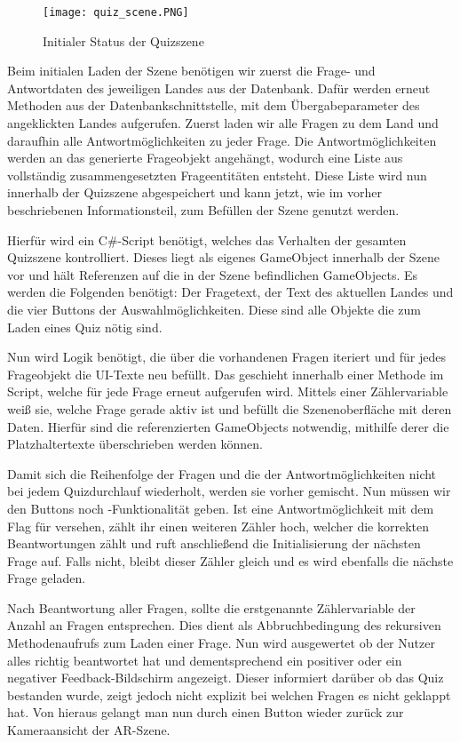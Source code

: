 \begin{figure} [h]
\centering
\texttt{[image: quiz\_scene.PNG]}
\caption{Initialer Status der Quizszene}
\label{fig:quizscene}
\end{figure}

Beim initialen Laden der Szene benötigen wir zuerst die Frage- und Antwortdaten des jeweiligen Landes aus der Datenbank.
Dafür werden erneut Methoden aus der Datenbankschnittstelle, mit dem Übergabeparameter des angeklickten Landes aufgerufen. 
Zuerst laden wir alle Fragen zu dem Land und daraufhin alle Antwortmöglichkeiten zu jeder Frage. 
Die Antwortmöglichkeiten werden an das generierte Frageobjekt angehängt, wodurch eine Liste aus vollständig zusammengesetzten Frageentitäten entsteht.
Diese Liste wird nun innerhalb der Quizszene abgespeichert und kann jetzt, wie im vorher beschriebenen Informationsteil, zum Befüllen der Szene genutzt werden.

Hierfür wird ein C\#-Script benötigt, welches das Verhalten der gesamten Quizszene kontrolliert.
Dieses liegt als eigenes GameObject innerhalb der Szene vor und hält Referenzen auf die in der Szene befindlichen GameObjects.
Es werden die Folgenden benötigt: Der Fragetext, der Text des aktuellen Landes und die vier Buttons der Auswahlmöglichkeiten.
Diese sind alle Objekte die zum Laden eines Quiz nötig sind.

Nun wird Logik benötigt, die über die vorhandenen Fragen iteriert und für jedes Frageobjekt die UI-Texte neu befüllt. Das geschieht innerhalb einer Methode im Script, welche für jede Frage erneut aufgerufen wird. 
Mittels einer Zählervariable weiß sie, welche Frage gerade aktiv ist und befüllt die Szenenoberfläche mit deren Daten.
Hierfür sind die referenzierten GameObjects notwendig, mithilfe derer die Platzhaltertexte überschrieben werden können. 

Damit sich die Reihenfolge der Fragen und die der Antwortmöglichkeiten nicht bei jedem Quizdurchlauf wiederholt, werden sie vorher gemischt. 
Nun müssen wir den Buttons noch -Funktionalität geben. 
Ist eine Antwortmöglichkeit mit dem Flag für  versehen, zählt ihr  einen weiteren Zähler hoch, welcher die korrekten Beantwortungen zählt und ruft anschließend die Initialisierung der nächsten Frage auf. 
Falls nicht, bleibt dieser Zähler gleich und es wird ebenfalls die nächste Frage geladen.

Nach Beantwortung aller Fragen, sollte die erstgenannte Zählervariable der Anzahl an Fragen entsprechen.
Dies dient als Abbruchbedingung des rekursiven Methodenaufrufs zum Laden einer Frage.
Nun wird ausgewertet ob der Nutzer alles richtig beantwortet hat und dementsprechend ein positiver oder ein negativer Feedback-Bildschirm angezeigt.
Dieser informiert darüber ob das Quiz bestanden wurde, zeigt jedoch nicht explizit bei welchen Fragen es nicht geklappt hat.
Von hieraus gelangt man nun durch einen Button wieder zurück zur Kameraansicht der AR-Szene.